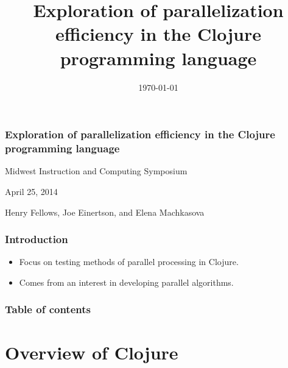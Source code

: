 \documentclass{beamer}
\begin{document}
\title{Exploration of parallelization efficiency in the Clojure programming language}
\date{\today}

\begin{frame}
\frametitle{Exploration of parallelization efficiency in the Clojure programming language}
{\centering
Midwest Instruction and Computing Symposium\par
April 25, 2014\par
Henry Fellows, Joe Einertson, and Elena Machkasova\par
}
\end{frame}


\begin{frame}[fragile]
\frametitle{Introduction}
	\begin{itemize}
	\item Focus on testing methods of parallel processing in Clojure.
	\item Comes from an interest in developing parallel algorithms.
	\end{itemize}

\end{frame}

\begin{frame}
\frametitle{Table of contents}
\tableofcontents %
\end{frame}

\section{Overview of Clojure}
\end{document}
